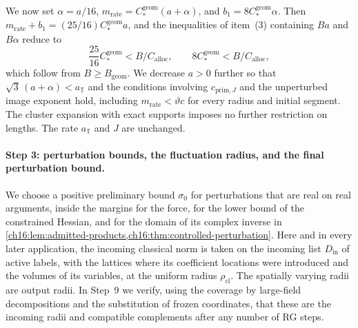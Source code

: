 We now set $\alpha=a/16$, $m_{\mathrm{rate}}=C_*^{\mathrm{geom}}(a+\alpha)$, and $b_1=8C_*^{\mathrm{geom}}\alpha$. Then $m_{\mathrm{rate}}+b_1=(25/16)C_*^{\mathrm{geom}}a$, and the inequalities of item~(3) containing $Ba$ and $B\alpha$ reduce to
\[
 \frac{25}{16}C_*^{\mathrm{geom}}<B/C_{\mathrm{alloc}},\qquad 8C_*^{\mathrm{geom}}<B/C_{\mathrm{alloc}},
\]
which follow from $B\ge B_{\mathrm{geom}}$. We decrease $a>0$ further so that $\sqrt3\,(a+\alpha)<a_{\mathbb T}$ and the conditions involving $c_{\mathrm{prim},J}$ and the unperturbed image exponent hold, including $m_{\mathrm{rate}}<\vartheta c$ for every radius and initial segment. The cluster expansion with exact supports imposes no further restriction on lengths. The rate $a_{\mathbb T}$ and $J$ are unchanged.

\paragraph{Step 3: perturbation bounds, the fluctuation radius, and the final perturbation bound.}
We choose a positive preliminary bound $\sigma_0$ for perturbations that are real on real arguments, inside the margins for the force, for the lower bound of the constrained Hessian, and for the domain of its complex inverse in \cref{ch16:lem:admitted-products,ch16:thm:controlled-perturbation}. Here and in every later application, the incoming classical norm is taken on the incoming list $D_{\mathrm{in}}$ of active labels, with the lattices where its coefficient locations were introduced and the volumes of its variables, at the uniform radius $\rho_{\mathrm{cl}}$. The spatially varying radii are output radii. In Step~9 we verify, using the coverage by large-field decompositions and the substitution of frozen coordinates, that these are the incoming radii and compatible complements after any number of RG steps.

